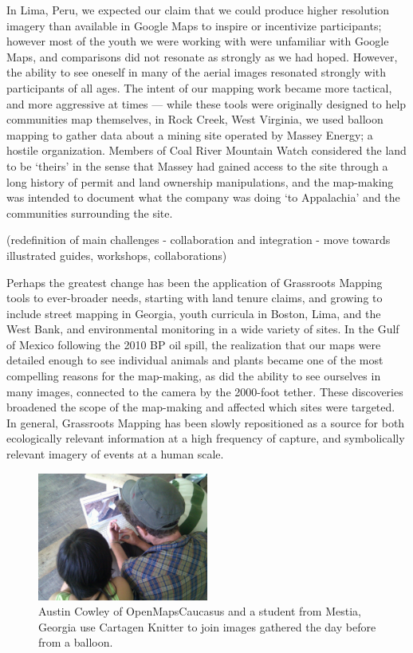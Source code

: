\documentclass[11pt,oneside,notitlepage]{report}
\begin{document}
In Lima, Peru, we expected our claim that we could produce higher resolution imagery than available in Google Maps to inspire or incentivize participants; however most of the youth we were working with were unfamiliar with Google Maps, and comparisons did not resonate as strongly as we had hoped. However, the ability to see oneself in many of the aerial images resonated strongly with participants of all ages. The intent of our mapping work became more tactical, and more aggressive at times --- while these tools were originally designed to help communities map themselves, in Rock Creek, West Virginia, we used balloon mapping to gather data about a mining site operated by Massey Energy; a hostile organization. Members of Coal River Mountain Watch considered the land to be `theirs' in the sense that Massey had gained access to the site through a long history of permit and land ownership manipulations, and the map-making was intended to document what the company was doing `to Appalachia' and the communities surrounding the site.

(redefinition of main challenges - collaboration and integration - move towards illustrated guides, workshops, collaborations)

Perhaps the greatest change has been the application of Grassroots Mapping tools to ever-broader needs, starting with land tenure claims, and growing to include street mapping in Georgia, youth curricula in Boston, Lima, and the West Bank, and environmental monitoring in a wide variety of sites. In the Gulf of Mexico following the 2010 BP oil spill, the realization that our maps were detailed enough to see individual animals and plants became one of the most compelling reasons for the map-making, as did the ability to see ourselves in many images, connected to the camera by the 2000-foot tether. These discoveries broadened the scope of the map-making and affected which sites were targeted. In general, Grassroots Mapping has been slowly repositioned as a source for both ecologically relevant information at a high frequency of capture, and symbolically relevant imagery of events at a human scale.

\begin{figure}
  \begin{flushleft}
	\includegraphics[width=0.5\textwidth]{images/knitter-mestia.jpg} 
	\caption{Austin Cowley of OpenMapsCaucasus and a student from Mestia, Georgia use Cartagen Knitter to join images gathered the day before from a balloon.}
  \end{flushleft}
\end{figure}
\end{document}
